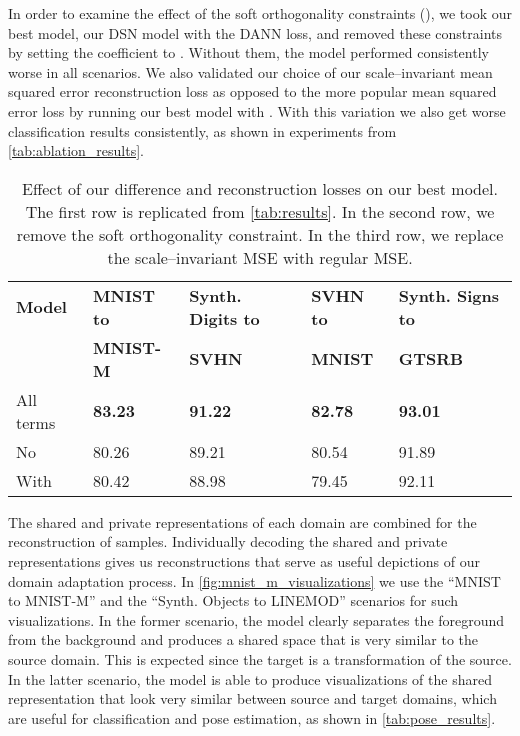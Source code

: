 \documentclass{article}
\begin{document}
In order to examine the effect of the soft orthogonality constraints (), we took our best model, our DSN model with the DANN loss, and removed these constraints by setting the  coefficient to . Without them, the model performed consistently worse in all scenarios.
We also validated our choice of our scale--invariant mean squared error reconstruction loss as opposed to the more popular mean squared error loss by running our best model with . With this variation we also get worse classification results consistently, as shown in experiments from \autoref{tab:ablation_results}.
\begin{table}[t]
\centering
\caption{Effect of our difference and reconstruction losses on our best model. The first row is replicated from \autoref{tab:results}. In the second row, we remove the soft orthogonality constraint. In the third row, we replace the scale--invariant MSE with regular MSE.}
\vspace{2mm}
\label{tab:ablation_results}
\begin{tabular}{ | l | l | l | l | l | }
\hline
\bf Model   & \bf MNIST to & \bf Synth. Digits to & \bf SVHN to  & \bf Synth. Signs to \\
 & \bf MNIST-M  & \bf SVHN        & \bf MNIST & \bf GTSRB\\ \hline \hline
All terms  & \textbf{83.23} & \textbf{91.22} & \textbf{82.78} & \textbf{93.01} \\ \hline 
No  & 80.26 & 89.21 &  80.54 & 91.89\\ \hline
With  & 80.42 & 88.98 &  79.45 & 92.11\\ \hline
\end{tabular}
\end{table}

The shared and private representations of each domain are combined for the reconstruction of samples. Individually decoding the shared and private representations gives us reconstructions that serve as useful depictions of our domain adaptation process. In \autoref{fig:mnist_m_visualizations} we use the ``MNIST to MNIST-M''  and the ``Synth. Objects to LINEMOD'' scenarios   for such visualizations.  In the former scenario, the model clearly separates the foreground from the background and produces a shared space that is very similar to the source domain. This is expected since the target is a transformation of the source. In the latter scenario, the model is able to produce visualizations of the shared representation that look very similar between source and target domains, which are useful for classification and pose estimation, as shown in \autoref{tab:pose_results}.
\end{document}
